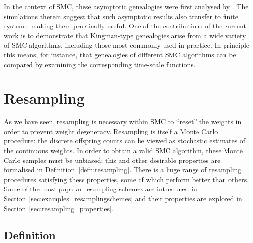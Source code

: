 In the context of SMC, these asymptotic genealogies were first analysed by \textcite{koskela2018}. The simulations therein suggest that such asymptotic results also transfer to finite systems, making them practically useful.
One of the contributions of the current work is to demonstrate that Kingman-type genealogies arise from a wide variety of SMC algorithms, including those most commonly used in practice.
In principle this means, for instance, that genealogies of different SMC algorithms can be compared by examining the corresponding time-scale functions.





\section{Resampling}
\label{sec:resampling}
As we have seen, resampling is necessary within SMC to ``reset'' the weights in order to prevent weight degeneracy.
Resampling is itself a Monte Carlo procedure: the discrete offspring counts can be viewed as stochastic estimates of the continuous weights.
In order to obtain a valid SMC algorithm, these Monte Carlo samples must be unbiased; this and other desirable properties are formalised in Definition~\ref{defn:resampling}.
There is a huge range of resampling procedures satisfying these properties, some of which perform better than others. 
Some of the most popular resampling schemes are introduced in Section~\ref{sec:examples_resamplingschemes} and their properties are explored in Section~\ref{sec:resampling_properties}.




\subsection{Definition}

